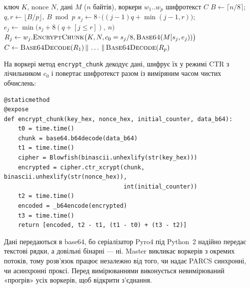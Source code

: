 \documentclass[a4paper,12pt]{article}
\begin{document}
\begin{algorithm}[H]
  \caption{Паралельне шифрування Blowfish-CTR на PARCS (master)}\label{alg:par}
  \begin{algorithmic}[1]
    \Require ключ $K$, nonce $N$, дані $M$ ($n$ байтів), воркери $w_1..w_p$
    \Ensure шифротекст $C$
    \State $B \gets \lceil n/8 \rceil$; \quad $q, r \gets \lfloor B/p \rfloor,\ B \bmod p$
     
      \State $s_j \gets 8 \cdot \bigl((j-1) q + \min(j-1, r)\bigr)$; \quad $e_j \gets \min\bigl(s_j + 8(q + [j \le r]),\ n\bigr)$
    \EndFor
     
      \State $R_j \gets w_j.\textsc{EncryptChunk}\bigl(K, N, c_0 = s_j/8, \textsc{Base64}(M[s_j, e_j))\bigr)$
    \EndFor
    \State \Return $C \gets \textsc{Base64Decode}(R_1) \,\|\, \dots \,\|\, \textsc{Base64Decode}(R_p)$
  \end{algorithmic}
\end{algorithm}

На воркері метод \texttt{encrypt\_chunk} декодує дані, шифрує їх у режимі CTR з
лічильником $c_0$ і повертає шифротекст разом із виміряним часом чистих обчислень:

\begin{lstlisting}[caption={Метод воркера, що викликається через Pyro4}]
@staticmethod
@expose
def encrypt_chunk(key_hex, nonce_hex, initial_counter, data_b64):
    t0 = time.time()
    chunk = base64.b64decode(data_b64)
    t1 = time.time()
    cipher = Blowfish(binascii.unhexlify(str(key_hex)))
    encrypted = cipher.ctr_xcrypt(chunk, binascii.unhexlify(str(nonce_hex)),
                                  int(initial_counter))
    t2 = time.time()
    encoded = _b64encode(encrypted)
    t3 = time.time()
    return [encoded, t2 - t1, (t1 - t0) + (t3 - t2)]
\end{lstlisting}

Дані передаються в base64, бо серіалізатор Pyro4 під Python~2 надійно передає
текстові рядки, а довільні бінарні --- ні. Master викликає воркерів з окремих
потоків, тому розв'язок працює незалежно від того, чи надає PARCS синхронні,
чи асинхронні проксі. Перед вимірюваннями виконується невимірюваний «прогрів»
усіх воркерів, щоб відкрити з'єднання.
\end{document}
